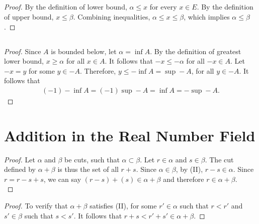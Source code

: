 \documentclass[12pt]{article}
\begin{document}
\subsection{}
\begin{proof}
				By the definition of lower bound, $\alpha\leq x$ for every $x\in E$.
				By the definition of upper bound, $x\leq\beta$. Combining inequalities, 
				$\alpha\leq x\leq\beta$, which implies $\alpha\leq\beta$.
\end{proof}
\subsection{}
\begin{proof}
				Since $A$ is bounded below, let $\alpha=\inf A$. By the definition of greatest lower bound,
				$x\geq\alpha$ for all $x\in A$. It follows that $-x\leq-\alpha$ for all $-x\in A$.
				Let $-x=y$ for some $y\in-A$. Therefore, $y\leq-\inf A=\sup -A$, for all $y\in-A$.
				It follows that
				\begin{gather*}
							(-1)-\inf A=(-1)\sup -A=\inf A=-\sup-A.
				\end{gather*}
\end{proof}
\section{Addition in the Real Number Field}
\begin{proof}
Let $\alpha$ and $\beta$ be cuts, such that $\alpha\subset\beta$. 
Let $r\in\alpha$ and $s\in\beta$. The cut defined by $\alpha+\beta$ is thus the set of all $r+s$. 
Since $\alpha\in\beta$, by (II), $r-s\in\alpha$. Since $r=r-s+s$, we can say $(r-s)+(s)
\in\alpha+\beta$ and therefore $r\in\alpha+\beta$.\\
\end{proof}

\begin{proof}
To verify that $\alpha + \beta$ satisfies (II), for some $r' \in \alpha$ such that $r < r'$ and 
$s' \in \beta$ such that $s < s'$. It follows that $r + s < r' + s' \in \alpha + \beta$.
\end{proof}
\end{document}
